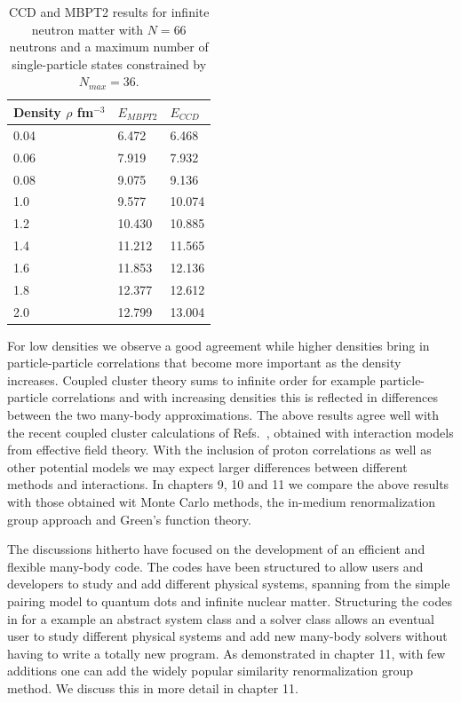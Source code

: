\begin{table}
\caption{CCD and MBPT2 results for infinite neutron matter with $N=66$ neutrons and a maximum number of single-particle states constrained by $N_{max}=36$. }\label{tab:ecomparison}
  \begin{center}
      \begin{tabular}{| l | l | l |}
      \hline Density $\rho$ fm$^{-3}$ & $E_{MBPT2}$ & $E_{CCD}$
      \\ \hline 0.04 & 6.472   & 6.468    \\ \hline
      0.06 & 7.919  & 7.932   \\ \hline
      0.08 & 9.075  & 9.136    \\ \hline
      1.0 & 9.577 &  10.074  \\  \hline
      1.2 & 10.430 & 10.885   \\ \hline
      1.4 & 11.212 & 11.565   \\  \hline
      1.6 & 11.853  & 12.136    \\  \hline
      1.8 & 12.377 & 12.612   \\ \hline
      2.0 & 12.799 & 13.004   \\ \hline
      \end{tabular}
  \end{center}
\end{table}
For low densities we observe a good agreement while higher densities
bring in particle-particle correlations that become more important as
the density increases. Coupled cluster theory sums to infinite order for
example particle-particle correlations and with increasing densities
this is reflected in differences between the two many-body
approximations.  The above results agree well with the recent coupled
cluster calculations of Refs.~\cite{baardsen2013,hagenmatter}, obtained with
interaction models from effective field theory.  With the inclusion of
proton correlations as well as other potential models we may expect 
larger differences between
different methods and interactions.  In chapters 9, 10 and 11 we compare the above results with 
those obtained wit Monte Carlo methods, the in-medium renormalization group approach and Green's function theory.

The discussions hitherto have focused on the
development of an efficient and flexible many-body code. The codes have been structured 
to allow users and developers to study and add different physical systems,
spanning from the simple pairing model to quantum dots and infinite
nuclear matter. Structuring the codes in for a example an abstract
system class and a solver class allows an eventual user to study
different physical systems and add new many-body solvers without
having to write a totally new program. As demonstrated in chapter 11, 
with few additions one can add 
the widely popular similarity renormalization group method. We discuss this in more detail in chapter 11. 

